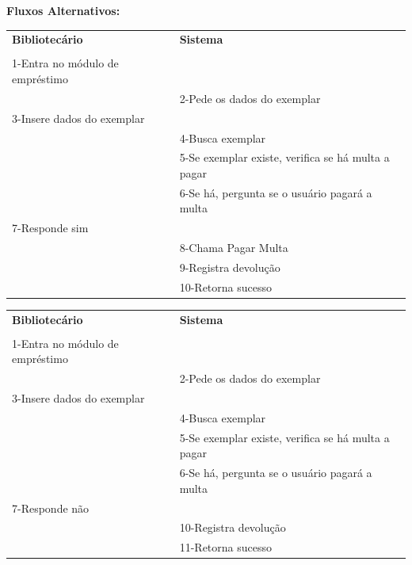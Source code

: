 \documentclass[
	12pt,				%
	openright,			%
	oneside,			%
	a4paper,			%
	english,			%
	brazil				%
	]{abntex2}
\begin{document}
\textbf{Fluxos Alternativos:}

\begin{table}[H]
\ABNTEXfontereduzida
\begin{center}
\begin{tabular}{p{5.5cm} p{5.5cm}}
    \textbf{Bibliotecário} & \textbf{Sistema}\\
     & \\
    1-Entra no módulo de empréstimo & \\
     & 2-Pede os dados do exemplar\\
    3-Insere dados do exemplar & \\
     & 4-Busca exemplar\\
     & 5-Se exemplar existe, verifica se há multa a pagar\\
     & 6-Se há, pergunta se o usuário pagará a multa\\
    7-Responde sim & \\
      & 8-Chama Pagar Multa\\
      & 9-Registra devolução\\
      & 10-Retorna sucesso\\
\end{tabular}
\end{center}
\end{table} 

\begin{table}[H]
\ABNTEXfontereduzida
\begin{center}
\begin{tabular}{p{5.5cm} p{5.5cm}}
    \textbf{Bibliotecário} & \textbf{Sistema}\\
     & \\
    1-Entra no módulo de empréstimo & \\
     & 2-Pede os dados do exemplar\\
    3-Insere dados do exemplar & \\
     & 4-Busca exemplar\\
     & 5-Se exemplar existe, verifica se há multa a pagar\\
     & 6-Se há, pergunta se o usuário pagará a multa\\
    7-Responde não & \\
      & 10-Registra devolução\\
      & 11-Retorna sucesso\\
\end{tabular}
\end{center}
\end{table} 
\end{document}
